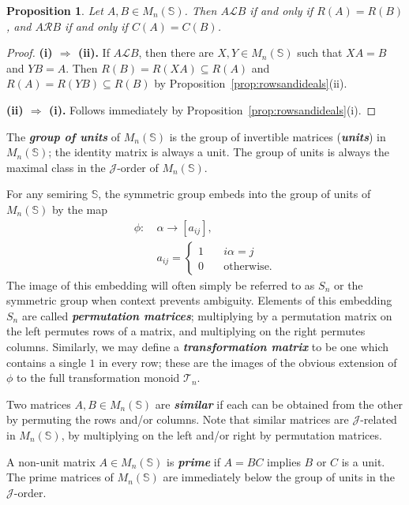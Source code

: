 \documentclass[11pt]{article}
\newtheorem{prop}[thm]{Proposition}
\newcommand{\defn}[1]{\textbf{\textit{#1}}}
\numberwithin{equation}{section}
\renewcommand{\to}{\longrightarrow}
\renewcommand{\L}{\mathscr{L}}
\newcommand{\R}{\mathscr{R}}
\newcommand{\J}{\mathscr{J}}
\begin{document}
\begin{prop} 
  Let $A, B \in M_n(\mathbb{S})$. Then $A \L B$ if and only if $R(A) = R(B)$,
  and $A \R B$ if and only if $C(A) = C(B)$. 
\end{prop}
\begin{proof}
  \textbf{(i) $\Rightarrow$ (ii).} 
  If $A \L B$, then there are $X, Y \in M_n(\mathbb{S})$ such that $XA = B$ and
  $YB = A$. Then $R(B) = R(XA) \subseteq R(A)$ and $R(A) = R(YB) \subseteq R(B)$
  by Proposition~\ref{prop:rowsandideals}(ii).
  \bigskip

  \textbf{(ii) $\Rightarrow$ (i).} Follows immediately by
  Proposition~\ref{prop:rowsandideals}(i). 
\end{proof}

The \defn{group of units} of $M_n(\mathbb{S})$ is the group of invertible
matrices (\defn{units}) in $M_n(\mathbb{S})$; the identity matrix is always a
unit. The group of units is always the maximal class in the $\J$-order of
$M_n(\mathbb{S})$.

For any semiring $\mathbb{S}$, the symmetric group embeds into the group of units of
$M_n(\mathbb{S})$ by the map 
\begin{align*}
  \phi:\: &\alpha \to [a_{ij}], \\
  &a_{ij} =
    \begin{cases}
      1 \quad & i\alpha = j \\ 
      0 \quad &\text{otherwise}.
    \end{cases}
\end{align*}
The image of this embedding will often simply be referred to as $S_n$ or the
symmetric group when context prevents ambiguity. Elements of this embedding
$S_n$ are called \defn{permutation matrices}; multiplying by a permutation
matrix on the left permutes rows of a matrix, and multiplying on the right
permutes columns. Similarly, we may define a \defn{transformation matrix} to be
one which contains a single $1$ in every row; these are the images of the
obvious extension of $\phi$ to the full transformation monoid $\mathcal{T}_n$.

Two matrices $A, B\in M_n(\mathbb{S})$ are \defn{similar} if each can be
obtained from the other by permuting the rows and/or columns. Note that similar
matrices are $\J$-related in $M_n(\mathbb{S})$, by multiplying on the left
and/or right by permutation matrices.

A non-unit matrix $A \in M_n(\mathbb{S})$ is \defn{prime} if $A = BC$ implies
$B$ or $C$ is a unit. The prime matrices of $M_n(\mathbb{S})$ are immediately
below the group of units in the $\J$-order. 
\end{document}
